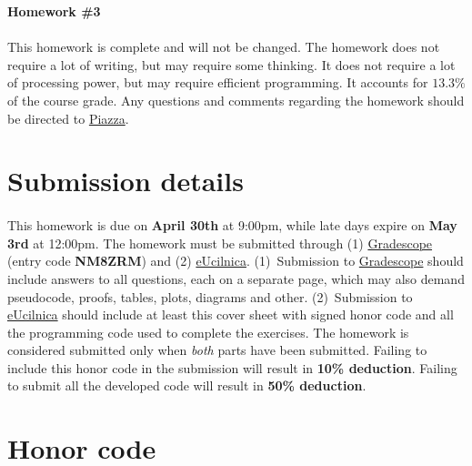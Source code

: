 \documentclass[11pt,a4paper]{article}
\begin{document}
 

\thispagestyle{titlestyle}

\vspace*{0.05in} 
\begin{center} 
	{\huge\bf Homework {\color{magenta}\#3}} 
\end{center} 
\vspace*{0.05in} 

\paragraph{} This homework is complete and will not be changed. The homework does not require a lot of writing, but may require some thinking. It does not require a lot of processing power, but may require efficient programming. It accounts for $13.3\%$ of the course grade. Any questions and comments regarding the homework should be directed to \href{https://piazza.com/class/kkn1oz577n2sq}{Piazza}.

\section*{Submission details}

\paragraph{} This homework is due on {\bf\color{magenta} April 30th} at 9:00pm, while late days expire on {\bf\color{magenta} May 3rd} at 12:00pm. The homework must be submitted through (1) \href{https://www.gradescope.com}{Gradescope} (entry code {\bf NM8ZRM}) and (2) \href{https://ucilnica.fri.uni-lj.si/course/view.php?id=183}{eUcilnica}. (1)~Submission to \href{https://www.gradescope.com}{Gradescope} should include answers to all questions, each on a separate page, which may also demand pseudocode, proofs, tables, plots, diagrams and other. (2)~Submission to \href{https://ucilnica.fri.uni-lj.si/course/view.php?id=183}{eUcilnica} should include at least this cover sheet with signed honor code and all the programming code used to complete the exercises. The homework is considered submitted only when \textit{both} parts have been submitted. Failing to include this honor code in the submission will result in {\bf\color{LimeGreen} 10\% deduction}. Failing to submit all the developed code will result in {\bf\color{LimeGreen} 50\% deduction}.

\section*{Honor code}
\end{document}
